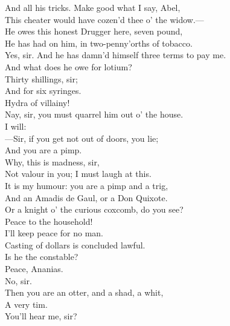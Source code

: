 \documentclass[a4paper,oneside]{memoir}
\begin{document}
\begin{drama*}
And all his tricks. Make good what I say, Abel,\\
This cheater would have cozen'd thee o' the widow.---\\
He owes this honest Drugger here, seven pound,\\
He has had on him, in two-penny'orths of tobacco.\\
\druggerspeaks Yes, sir. And he has damn'd himself three terms to pay me.\\
\facespeaks And what does he owe for lotium?\\
\druggerspeaks {} Thirty shillings, sir;\\
And for six syringes.\\
\surlyspeaks {} Hydra of villainy!\\
\facespeaks Nay, sir, you must quarrel him out o' the house.\\
\kastrilspeaks {} I will:\\
---Sir, if you get not out of doors, you lie;\\
And you are a pimp.\\
\surlyspeaks {} Why, this is madness, sir,\\
Not valour in you; I must laugh at this.\\
\kastrilspeaks It is my humour: you are a pimp and a trig,\\
And an Amadis de Gaul, or a Don Quixote.\\
\druggerspeaks Or a knight o' the curious coxcomb, do you see?\\
\ananiasspeaks Peace to the household!\\
\kastrilspeaks {} I'll keep peace for no man.\\
\ananiasspeaks Casting of dollars is concluded lawful.\\
\kastrilspeaks Is he the constable?\\
\subtlespeaks {} Peace, Ananias.\\
\facespeaks No, sir.\\
\kastrilspeaks {} Then you are an otter, and a shad, a whit,\\
A very tim.\\
\surlyspeaks {} You'll hear me, sir?\\

\end{drama*}
\end{document}
